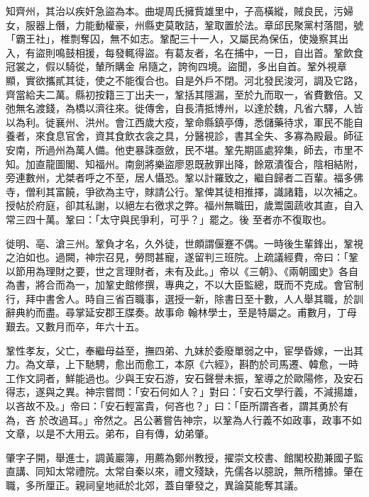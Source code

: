 \begin{pinyinscope}
 知齊州，其治以疾奸急盜為本。曲堤周氏擁貲雄里中，子高橫縱，賊良民，污婦女，服器上僭，力能動權豪，州縣吏莫敢詰，鞏取置於法。章邱民聚黨村落間，號「霸王社」，椎剽奪囚，無不如志。鞏配三十一人，又屬民為保伍，使幾察其出入，有盜則鳴鼓相援，每發輒得盜。有葛友者，名在捕中，一日，自出首。鞏飲食冠裳之，假以騎從，輦所購金
 帛隨之，誇徇四境。盜聞，多出自首。鞏外視章顯，實欲攜貳其徒，使之不能復合也。自是外戶不閉。河北發民浚河，調及它路，齊當給夫二萬。縣初按籍三丁出夫一，鞏括其隱漏，至於九而取一，省費數倍。又弛無名渡錢，為橋以濟往來。徙傳舍，自長清抵博州，以達於魏，凡省六驛，人皆以為利。徙襄州、洪州。會江西歲大疫，鞏命縣鎮亭傳，悉儲藥待求，軍民不能自養者，來食息官舍，資其食飲衣衾之具，分醫視診，書其全失、多寡為殿最。師征
 安南，所過州為萬人備。他吏暴誅亟斂，民不堪。鞏先期區處猝集，師去，市里不知。加直龍圖閣、知福州。南劍將樂盜廖恩既赦罪出降，餘眾潰復合，陰相結附，旁連數州，尤桀者呼之不至，居人懾恐。鞏以計羅致之，繼自歸者二百輩。福多佛寺，僧利其富饒，爭欲為主守，賕請公行。鞏俾其徒相推擇，識諸籍，以次補之。授帖於府庭，卻其私謝，以絕左右徼求之弊。福州無職田，歲鬻園蔬收其直，自入常三四十萬。鞏曰：「太守與民爭利，可乎？」罷之。後
 至者亦不復取也。



 徙明、亳、滄三州。鞏負才名，久外徒，世頗謂偃蹇不偶。一時後生輩鋒出，鞏視之泊如也。過闕，神宗召見，勞問甚寵，遂留判三班院。上疏議經費，帝曰：「鞏以節用為理財之要，世之言理財者，未有及此。」帝以《三朝》、《兩朝國史》各自為書，將合而為一，加鞏史館修撰，專典之，不以大臣監總，既而不克成。會官制行，拜中書舍人。時自三省百職事，選授一新，除書日至十數，人人舉其職，於訓辭典約而盡。尋掌延安郡王牒奏。故事命
 翰林學士，至是特屬之。甫數月，丁母艱去。又數月而卒，年六十五。



 鞏性孝友，父亡，奉繼母益至，撫四弟、九妹於委廢單弱之中，宦學昏嫁，一出其力。為文章，上下馳騁，愈出而愈工，本原《六經》，斟酌於司馬遷、韓愈，一時工作文詞者，鮮能過也。少與王安石游，安石聲譽未振，鞏導之於歐陽修，及安石得志，遂與之異。神宗嘗問：「安石何如人？」對曰：「安石文學行義，不減揚雄，以吝故不及。」帝曰：「安石輕富貴，何吝也？」曰：「臣所謂吝者，謂其勇於有為，吝
 於改過耳。」帝然之。呂公著嘗告神宗，以鞏為人行義不如政事，政事不如文章，以是不大用云。弟布，自有傳，幼弟肇。



 肇字子開，舉進士，調黃巖簿，用薦為鄭州教授，擢崇文校書、館閣校勘兼國子監直講、同知太常禮院。太常自秦以來，禮文殘缺，先儒各以臆說，無所稽據。肇在職，多所厘正。親祠皇地祗於北郊，蓋自肇發之，異論莫能奪其議。




\end{pinyinscope}
